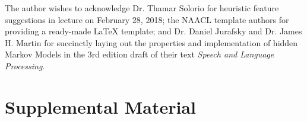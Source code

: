 \documentclass[11pt,a4paper]{article}
\begin{document}
The author wishes to acknowledge Dr. Thamar Solorio for heuristic feature suggestions in
lecture on February 28, 2018; the NAACL template authors for providing a ready-made
{\LaTeX} template; and Dr. Daniel Jurafsky and Dr. James H. Martin for succinctly laying out the
properties and implementation of hidden Markov Models in the 3rd edition draft of their
text \emph{Speech and Language Processing}.




\appendix

\section{Supplemental Material}
\label{sec:supplemental}
\end{document}
